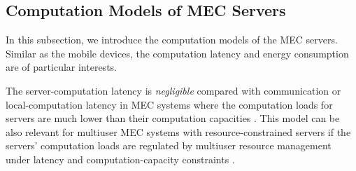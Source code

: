 \documentclass[journal]{IEEEtran}
\begin{document}
\subsection{Computation Models of MEC Servers}

In this subsection, we introduce the computation models of the MEC servers. Similar as the mobile devices, the computation latency  and energy consumption are of particular interests.

The server-computation latency  is \emph{negligible} compared with communication or local-computation latency in  MEC systems where  the computation loads for servers are much lower than  their computation capacities  \cite{WZhangTWC1312, you2016energyJSAC}. This model can be also relevant for  multiuser MEC systems with resource-constrained servers  if the servers' computation loads are regulated by multiuser resource management under latency and computation-capacity constraints \cite{you2016energy}.
\end{document}
